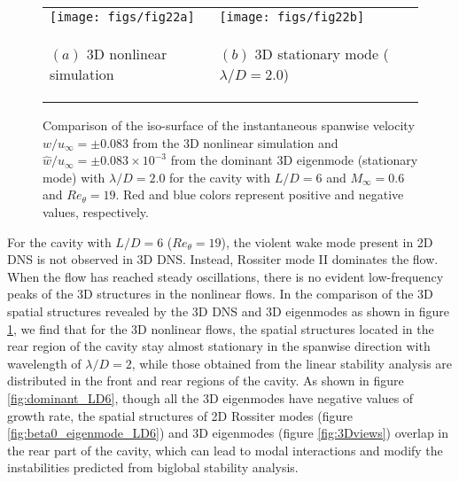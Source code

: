 \documentclass{jfm}
\begin{document}
\begin{figure}
\centering
\begin{tabular}{m{2.2in}m{2.2in}} 
\texttt{[image: figs/fig22a]}	&	\texttt{[image: figs/fig22b]}  \\ 
\begin{center}$(a)$ 3D nonlinear simulation \end{center} & \begin{center} $(b)$ 3D stationary mode ($\lambda/D=2.0$) \end{center}
\end{tabular}
\caption{Comparison of the iso-surface of the instantaneous spanwise velocity $w/u_\infty=\pm0.083$ from the 3D nonlinear simulation and $\hat w/u_\infty=\pm0.083\times 10^{-3}$ from the dominant 3D eigenmode (stationary mode) with $\lambda/D=2.0$ for the cavity with $L/D=6$ and $M_\infty=0.6$ and $Re_\theta=19$. Red and blue colors represent positive and negative values, respectively.}
\label{fig:3Dnon_LD6}
\end{figure}

For the cavity with $L/D=6$ ($Re_\theta=19$), the violent wake mode present in 2D DNS is not observed in 3D DNS. Instead, Rossiter mode II dominates the flow. When the flow has reached steady oscillations, there is no evident low-frequency peaks of the 3D structures in the nonlinear flows. In the comparison of the 3D spatial structures revealed by the 3D DNS and 3D eigenmodes as shown in figure \ref{fig:3Dnon_LD6}, we find that for the 3D nonlinear flows, the spatial structures located in the rear region of the cavity stay almost stationary in the spanwise direction with wavelength of $\lambda/D=2$, while those obtained from the linear stability analysis are distributed in the front and rear regions of the cavity. As shown in figure \ref{fig:dominant_LD6}, though all the 3D eigenmodes have negative values of growth rate, the spatial structures of 2D Rossiter modes (figure \ref{fig:beta0_eigenmode_LD6}) and 3D eigenmodes (figure \ref{fig:3Dviews}) overlap in the rear part of the cavity, which can lead to modal interactions and modify the instabilities predicted from biglobal stability analysis. 
\end{document}
